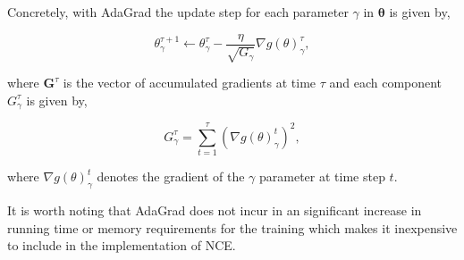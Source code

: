 Concretely, with AdaGrad the update step for each parameter $\gamma$ in $\boldsymbol{\theta}$ is given by,

\begin{equation}
\theta^{\tau + 1}_{\gamma} \leftarrow \theta^{\tau}_{\gamma} - \frac{\eta}{\sqrt{G_{\gamma}}} \nabla g(\theta)^{\tau}_{\gamma},
\end{equation}

where $\mathbf{G}^{\tau}$ is the vector of accumulated gradients at time $\tau$ and each component $G^{\tau}_\gamma$ is given by,

\begin{equation}
G^{\tau}_{\gamma} = \sum_{t=1}^{\tau} \left(\nabla g(\theta)^{t}_{\gamma}\right)^{2},
\label{eq:adagrad-g}
\end{equation}

where $\nabla g(\theta)^{t}_{\gamma}$ denotes the gradient of the $\gamma$ parameter at time step $t$.

It is worth noting that AdaGrad does not incur in an significant increase in running time or memory requirements for the training which makes it inexpensive to include in the implementation of NCE.



